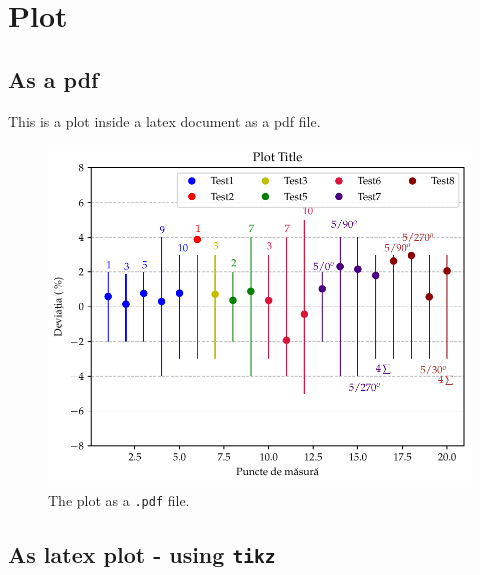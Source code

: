 \documentclass[11pt]{article}
\begin{document}
\maketitle
\section{Plot}
\subsection{As a pdf}
This is a plot inside a latex document as a pdf file.
\begin{figure}[h]
    \centering
    \includegraphics[scale=0.6]{../errorPlots/multiple.pdf}
    \caption{The plot as a \texttt{.pdf} file.}
\end{figure}
\subsection{As latex plot - using \texttt{tikz}}

\hskip 5pt
\end{document}
